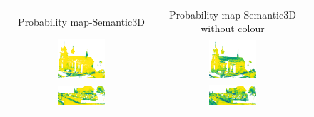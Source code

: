     \begin{figure}[h!]
        \centering
        \begin{tabular}{cc}
            Probability map-Semantic3D & Probability map-Semantic3D without colour \\
            \includegraphics[width=0.33\textwidth, height=0.18\textheight]{images/ood_imgs/fout_sem3d/fout_prob_1.pdf}&
            \includegraphics[width=0.33\textwidth, height=0.18\textheight]{images/sem3d_of/fout_prob_sem3d_of_1.pdf}\\

            \includegraphics[width=0.33\textwidth, height=0.18\textheight]{images/ood_imgs/fout_sem3d/fout_prob_2.pdf}&
            \includegraphics[width=0.33\textwidth, height=0.18\textheight]{images/sem3d_of/fout_prob_sem3d_of_2.pdf}\\


\end{tabular}
\end{figure}
